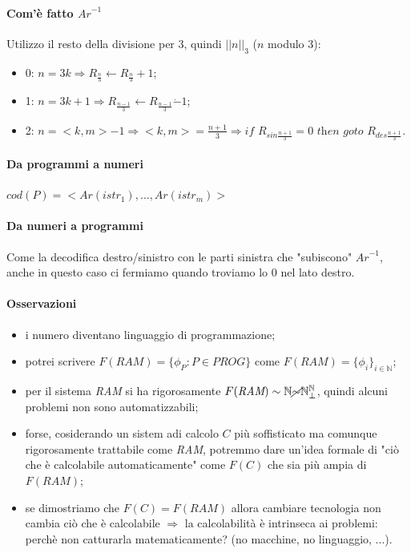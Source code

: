 \documentclass{article}
\begin{document}
\paragraph{Com'è fatto $\textit{Ar}^{-1}$}
Utilizzo il resto della divisione per 3, quindi $||n||_3$ ($n$ modulo 3):
\begin{itemize}
	\item 0: $n=3k \Rightarrow R_{\frac{n}{3}} \leftarrow R_{\frac{n}{3}}+1$;
	\item 1: $n=3k+1 \Rightarrow R_{\frac{n-1}{3}} \leftarrow R_{\frac{n-1}{3}}\dot{-}1$;
	\item 2: $n=<k,m>-1 \Rightarrow <k,m>=\frac{n+1}{3} \Rightarrow \textit{if } R_{\textit{sin}\frac{n+1}{3}} = 0 \textit{ then goto } R_{\textit{des}\frac{n+1}{3}}$.
\end{itemize}
\paragraph{Da programmi a numeri}
$\textit{cod}(P)=<\textit{Ar}(\textit{istr}_1), \dots, \textit{Ar}(\textit{istr}_m)>$
\paragraph{Da numeri a programmi}
Come la decodifica destro/sinistro con le parti sinistra che "subiscono" $\textit{Ar}^{-1}$, anche in questo caso ci fermiamo quando troviamo lo $0$ nel lato destro.
\paragraph{Osservazioni}
\begin{itemize}
	\item i numero diventano linguaggio di programmazione;
	\item potrei scrivere $F(\textit{RAM})= \{\phi_{P}:P \in \textit{PROG}\}$ come $F(\textit{RAM})= \{ \phi_i \}_{i \in \mathbb{N}}$;
	\item per il sistema \textit{RAM} si ha rigorosamente $F(\textit{RAM}) \sim \mathbb{N} \cancel{\sim} \mathbb{N}^{\mathbb{N}}_{\perp}$, quindi alcuni problemi non sono automatizzabili;
	\item forse, cosiderando un sistem adi calcolo $C$ più soffisticato ma comunque rigorosamente trattabile come \textit{RAM}, potremmo dare un'idea formale di "ciò che è calcolabile automaticamente" come $F(C)$ che sia più ampia di $F(\textit{RAM})$;
	\item se dimostriamo  che $F(C)=F(\textit{RAM})$ allora cambiare tecnologia non cambia ciò che è calcolabile $\Rightarrow$ la calcolabilità è intrinseca ai problemi: perchè non catturarla matematicamente? (no macchine, no linguaggio, ...).
\end{itemize}
\end{document}
